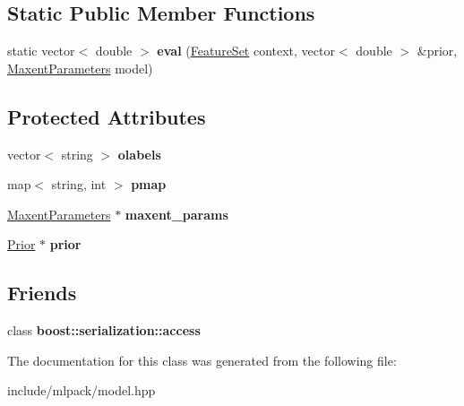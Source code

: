 \subsection*{Static Public Member Functions}
\begin{DoxyCompactItemize}
\item 
\hypertarget{classmlpack_1_1_g_i_s_model_a9aa802dd7a6e98fe771cda2da611982c}{
static vector$<$ double $>$ {\bfseries eval} (\hyperlink{structmlpack_1_1_feature_set}{FeatureSet} context, vector$<$ double $>$ \&prior, \hyperlink{classmlpack_1_1_maxent_parameters}{MaxentParameters} model)}
\label{classmlpack_1_1_g_i_s_model_a9aa802dd7a6e98fe771cda2da611982c}

\end{DoxyCompactItemize}
\subsection*{Protected Attributes}
\begin{DoxyCompactItemize}
\item 
\hypertarget{classmlpack_1_1_g_i_s_model_a1f75f3fbb76b7e38ed81f5a1b9387d1e}{
vector$<$ string $>$ {\bfseries olabels}}
\label{classmlpack_1_1_g_i_s_model_a1f75f3fbb76b7e38ed81f5a1b9387d1e}

\item 
\hypertarget{classmlpack_1_1_g_i_s_model_a610ca84b801a2a91d63374b2d0d8871b}{
map$<$ string, int $>$ {\bfseries pmap}}
\label{classmlpack_1_1_g_i_s_model_a610ca84b801a2a91d63374b2d0d8871b}

\item 
\hypertarget{classmlpack_1_1_g_i_s_model_ae9f9e8d5dab18d55bd90d2afb0b4d487}{
\hyperlink{classmlpack_1_1_maxent_parameters}{MaxentParameters} $\ast$ {\bfseries maxent\_\-params}}
\label{classmlpack_1_1_g_i_s_model_ae9f9e8d5dab18d55bd90d2afb0b4d487}

\item 
\hypertarget{classmlpack_1_1_g_i_s_model_a9a2e28ae8bc7f625aeda3985d660d716}{
\hyperlink{classmlpack_1_1_prior}{Prior} $\ast$ {\bfseries prior}}
\label{classmlpack_1_1_g_i_s_model_a9a2e28ae8bc7f625aeda3985d660d716}

\end{DoxyCompactItemize}
\subsection*{Friends}
\begin{DoxyCompactItemize}
\item 
\hypertarget{classmlpack_1_1_g_i_s_model_ac98d07dd8f7b70e16ccb9a01abf56b9c}{
class {\bfseries boost::serialization::access}}
\label{classmlpack_1_1_g_i_s_model_ac98d07dd8f7b70e16ccb9a01abf56b9c}

\end{DoxyCompactItemize}


The documentation for this class was generated from the following file:\begin{DoxyCompactItemize}
\item 
include/mlpack/model.hpp\end{DoxyCompactItemize}
